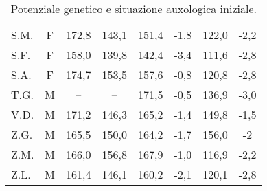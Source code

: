 \begin{table}[!h]
\begin{center}
\begin{tabular}{lccccccc}
S.M.	& F & 172,8 & 143,1 & 151,4 & -1,8 	        	& 122,0 & -2,2  \\
S.F.	& F & 158,0 & 139,8 & 142,4 & -3,4 	  		& 111,6 & -2,8  \\
S.A.	& F & 174,7 & 153,5 & 157,6 & -0,8 	  		& 120,8 & -2,8  \\
T.G.    & M & --    & --    & 171,5 & -0,5    			& 136,9 & -3,0  \\
V.D.	& M & 171,2 & 146,3 & 165,2 & -1,4 	  		& 149,8 & -1,5  \\
Z.G.	& M & 165,5 & 150,0 & 164,2 & -1,7 	  		& 156,0 & -2     \\
Z.M.	& M & 166,0 & 156,8 & 167,9 & -1,0 	  		& 116,9 & -2,2  \\
Z.L.	& M & 161,4 & 146,1 & 160,2 & -2,1 	  		& 120,1 & -2,8  \\
\bottomrule
\end{tabular}
\end{center}
\caption{Potenziale genetico e situazione auxologica iniziale.}
\label{tab:SituazioneIniziale}
\end{table}


